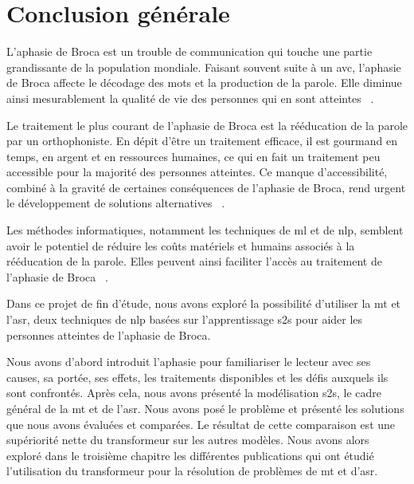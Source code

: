 \chapter*{Conclusion générale}
\label{chap.general-conclusion}

L'aphasie de Broca est un trouble de communication qui touche une partie grandissante de la population mondiale.
Faisant souvent suite à un \gls{avc}, l'aphasie de Broca affecte le décodage des mots et la production de la parole.
Elle diminue ainsi mesurablement la qualité de vie des personnes qui en sont atteintes%
~\cite{Feigin_Brainin_Norrving_Martins_Sacco_Hacke_Fisher_Pandian_Lindsay_2022,Chapey_2008,Ross_Wertz_2010}.

Le traitement le plus courant de l'aphasie de Broca est la rééducation de la parole par un orthophoniste.
En dépit d'être un traitement efficace, il est gourmand en temps, en argent et en ressources humaines,
ce qui en fait un traitement peu accessible pour la majorité des personnes atteintes.
Ce manque d'accessibilité, combiné à la gravité de certaines conséquences de l'aphasie de Broca,
rend urgent le développement de solutions alternatives%
~\cite{recover,Flowers_Skoretz_Silver_Rochon_Fang_Flamand-Roze_Martino_2016}.

Les méthodes informatiques, notamment les techniques de \gls{ml} et de \gls{nlp},
semblent avoir le potentiel de réduire les coûts matériels et humains associés à la rééducation de la parole.
Elles peuvent ainsi faciliter l'accès au traitement de l'aphasie de Broca%
~\cite{Smaili_Langlois_Pribil_2022,Qin_Lee_Kong_Lin_2022,Misra_Mishra_Gandhi_2022}.

Dans ce projet de fin d'étude, nous avons exploré la possibilité d'utiliser la \gls{mt} et l'\gls{asr},
deux techniques de \gls{nlp} basées sur l'apprentissage \gls{s2s} 
pour aider les personnes atteintes de l'aphasie de Broca.

Nous avons d'abord introduit l'aphasie pour familiariser le lecteur avec
ses causes, sa portée, ses effets, les traitements disponibles et les défis auxquels ils sont confrontés.
Après cela, nous avons présenté la modélisation \gls{s2s}, le cadre général de la \gls{mt} et de l'\gls{asr}.
Nous avons posé le problème et présenté les solutions que nous avons évaluées et comparées.
Le résultat de cette comparaison est une supériorité nette du transformeur sur les autres modèles.
Nous avons alors exploré dans le troisième chapitre les différentes publications qui ont étudié
l'utilisation du transformeur pour la résolution de problèmes de \gls{mt} et d'\gls{asr}.


